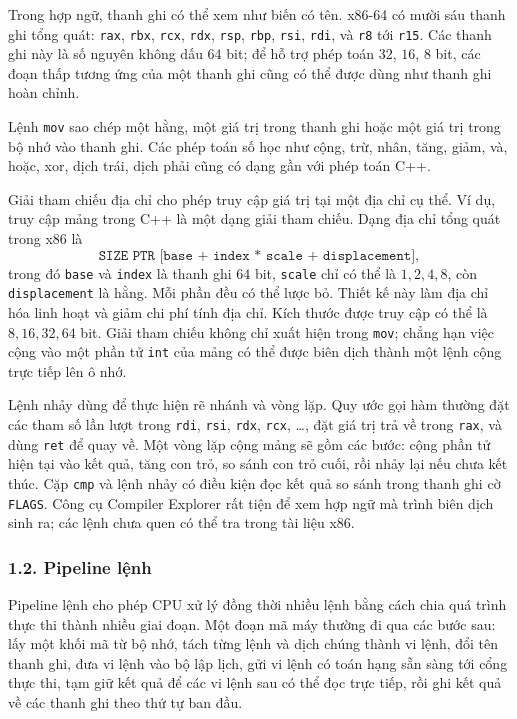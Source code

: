 \documentclass[11pt]{article}
\begin{document}
Trong hợp ngữ, thanh ghi có thể xem như biến có tên. x86-64 có mười sáu thanh
ghi tổng quát: \texttt{rax}, \texttt{rbx}, \texttt{rcx}, \texttt{rdx},
\texttt{rsp}, \texttt{rbp}, \texttt{rsi}, \texttt{rdi}, và
\texttt{r8} tới \texttt{r15}. Các thanh ghi này là số nguyên không dấu \(64\)
bit; để hỗ trợ phép toán \(32\), \(16\), \(8\) bit, các đoạn thấp tương ứng của
một thanh ghi cũng có thể được dùng như thanh ghi hoàn chỉnh.


Lệnh \texttt{mov} sao chép một hằng, một giá trị trong thanh ghi hoặc một giá
trị trong bộ nhớ vào thanh ghi. Các phép toán số học như cộng, trừ, nhân, tăng,
giảm, và, hoặc, xor, dịch trái, dịch phải cũng có dạng gần với phép toán C++.

Giải tham chiếu địa chỉ cho phép truy cập giá trị tại một địa chỉ cụ thể. Ví
dụ, truy cập mảng trong C++ là một dạng giải tham chiếu. Dạng địa chỉ tổng quát
trong x86 là
\[
  \texttt{SIZE PTR [base + index * scale + displacement]},
\]
trong đó \texttt{base} và \texttt{index} là thanh ghi \(64\) bit,
\texttt{scale} chỉ có thể là \(1,2,4,8\), còn \texttt{displacement} là hằng.
Mỗi phần đều có thể lược bỏ. Thiết kế này làm địa chỉ hóa linh hoạt và giảm
chi phí tính địa chỉ. Kích thước được truy cập có thể là \(8,16,32,64\) bit.
Giải tham chiếu không chỉ xuất hiện trong \texttt{mov}; chẳng hạn việc cộng vào
một phần tử \texttt{int} của mảng có thể được biên dịch thành một lệnh cộng
trực tiếp lên ô nhớ.

Lệnh nhảy dùng để thực hiện rẽ nhánh và vòng lặp. Quy ước gọi hàm thường đặt
các tham số lần lượt trong \texttt{rdi}, \texttt{rsi}, \texttt{rdx},
\texttt{rcx}, \ldots, đặt giá trị trả về trong \texttt{rax}, và dùng
\texttt{ret} để quay về. Một vòng lặp cộng mảng sẽ gồm các bước: cộng phần tử
hiện tại vào kết quả, tăng con trỏ, so sánh con trỏ cuối, rồi nhảy lại nếu chưa
kết thúc. Cặp \texttt{cmp} và lệnh nhảy có điều kiện đọc kết quả so sánh trong
thanh ghi cờ \texttt{FLAGS}. Công cụ Compiler Explorer rất tiện để xem hợp ngữ
mà trình biên dịch sinh ra; các lệnh chưa quen có thể tra trong tài liệu x86.

\subsubsection*{1.2. Pipeline lệnh}

Pipeline lệnh cho phép CPU xử lý đồng thời nhiều lệnh bằng cách chia quá trình
thực thi thành nhiều giai đoạn. Một đoạn mã máy thường đi qua các bước sau:
lấy một khối mã từ bộ nhớ, tách từng lệnh và dịch chúng thành vi lệnh, đổi tên
thanh ghi, đưa vi lệnh vào bộ lập lịch, gửi vi lệnh có toán hạng sẵn sàng tới
cổng thực thi, tạm giữ kết quả để các vi lệnh sau có thể đọc trực tiếp, rồi
ghi kết quả về các thanh ghi theo thứ tự ban đầu.
\end{document}
